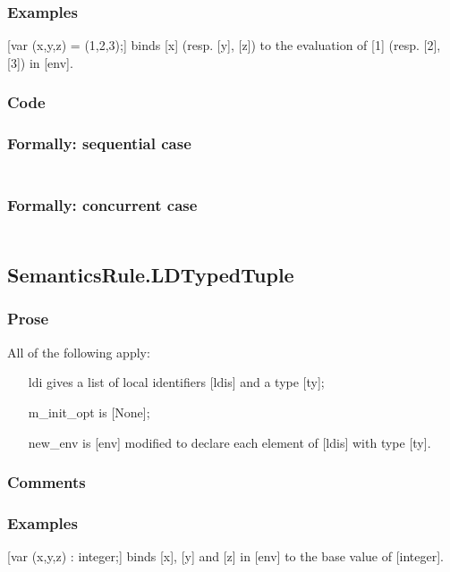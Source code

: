 \documentclass{book}
\begin{document}
    \subsubsection{Examples}
    [var (x,y,z) = (1,2,3);] binds [x] (resp. [y], [z]) to the evaluation of
    [1] (resp. [2], [3]) in [env].

  \subsubsection{Code}

  \subsubsection{Formally: sequential case}
  \begin{align}
  \end{align} 

  \subsubsection{Formally: concurrent case}
  \begin{align}
  \end{align} 

\subsection{SemanticsRule.LDTypedTuple \label{sec:SemanticsRule.LDTypedTuple}}

    \subsubsection{Prose}
    All of the following apply:
    \begin{itemize}
    \item [ldi] gives a list of local identifiers [ldis] and a type [ty];
    \item [m\_init\_opt] is [None];
    \item [new\_env] is [env] modified to declare each element of [ldis] with type
      [ty].
    \end{itemize}

    \subsubsection{Comments}

    \subsubsection{Examples}
    [var (x,y,z) : integer;] binds [x], [y] and [z] in [env] to the base value
    of [integer].
\end{document}
